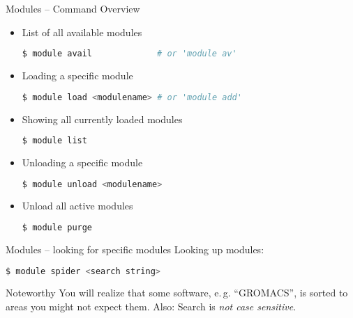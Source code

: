 \begin{frame}[fragile]
  {Modules -- Command Overview}
  \vspace{-1em}
  \begin{itemize}
    \setlength\itemsep{-0.1em}
  \item List of all available modules
    \begin{lstlisting}[language=Bash, style=Shell]
$ module avail             # or 'module av'
    \end{lstlisting}
  \item Loading a specific module
    \begin{lstlisting}[language=Bash, style=Shell]
$ module load <modulename> # or 'module add'
    \end{lstlisting}
  \item Showing all currently loaded modules
    \begin{lstlisting}[language=Bash, style=Shell]
$ module list
    \end{lstlisting}
  \item Unloading a specific module
    \begin{lstlisting}[language=Bash, style=Shell]
$ module unload <modulename>
    \end{lstlisting}
  \item Unload all active modules
    \begin{lstlisting}[language=Bash, style=Shell]
$ module purge
    \end{lstlisting}
  \end{itemize}
  \vfill
\end{frame}


\begin{frame}[fragile]
  {Modules -- looking for specific modules}
  Looking up modules:
  \begin{lstlisting}[language=Bash, style=Shell]
$ module spider <search string>
  \end{lstlisting}
  \pause
  \pause
  \begin{block}{Noteworthy}
    You will realize that some software, e.\,g. ``GROMACS'', is sorted to areas you 
    might not expect them. Also: Search is \emph{not case sensitive}.
  \end{block}
\end{frame}

